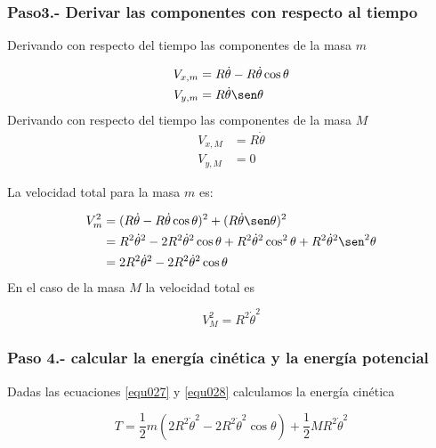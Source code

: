 \documentclass[12pt]{book}
\theoremstyle{definition}
\theoremstyle{remark}
\theoremstyle{plain}
\begin{document}
\subsubsection{Paso3.-  Derivar las componentes con respecto al tiempo}

Derivando con respecto del tiempo las componentes de la masa $m$

\begin{equation}
\label{equ025}
\begin{aligned}
V_{x,m} & =R \dot{\theta} - R \dot{\theta} \cos \theta \\
V_{y,m} & = R \dot{\theta} \sen \theta
\end{aligned}
\end{equation}
Derivando con respecto del tiempo las componentes de la masa $M$
\begin{equation}
\label{equ026}
\begin{aligned}
V_{x,M} & =R \dot{\theta} \\
V_{y,M} & = 0
\end{aligned}
\end{equation}

La velocidad total para la masa $m$ es:

\begin{equation}
\label{equ027}
\begin{aligned}
V_{m} ^2 &  = (R \dot{\theta} - R \dot{\theta} \cos \theta)^2+(R \dot{\theta} \sen \theta)^2 \\
 & = R^2 \dot{\theta}^2- 2 R^2 \dot{\theta}^2 \cos \theta + R^2 \dot{\theta}^2 \cos ^2 \theta + R^2 \dot{\theta}^2  \sen ^2 \theta \\
&  =2  R^2 \dot{\theta}^2- 2 R^2 \dot{\theta}^2 \cos \theta 
\end{aligned}
\end{equation}
En el caso de la masa $M$ la velocidad total es

\begin{equation}
\label{equ028}
V_M ^2=R ^2 \dot{\theta}^2 
\end{equation}

\subsubsection{Paso 4.- calcular la energía cinética y la energía potencial}
Dadas las ecuaciones \ref{equ027} y \ref{equ028} calculamos la energía cinética

\begin{equation}
\label{equ029}
T = \frac{1}{2} m (2  R^2 \dot{\theta}^2- 2 R^2 \dot{\theta}^2 \cos \theta )+\frac{1}{2} M R ^2 \dot{\theta}^2 
\end{equation}
\end{document}
